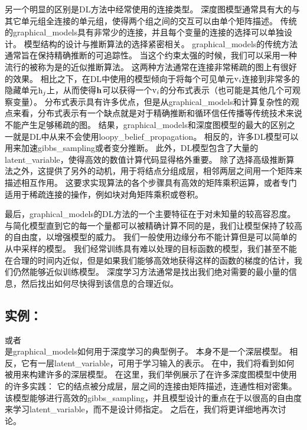 另一个明显的区别是\gls{DL}方法中经常使用的连接类型。
深度图模型通常具有大的与其它单元组全连接的单元组，使得两个组之间的交互可以由单个矩阵描述。
传统的\gls{graphical_models}具有非常少的连接，并且每个变量的连接的选择可以单独设计。
模型结构的设计与推断算法的选择紧密相关。
\gls{graphical_models}的传统方法通常旨在保持精确推断的可追踪性。
当这个约束太强的时候，我们可以采用一种流行的被称为是的近似推断算法。
这两种方法通常在连接非常稀疏的图上有很好的效果。
相比之下，在\gls{DL}中使用的模型倾向于将每个可见单元$\mathrm{v}_i$连接到非常多的隐藏单元$\mathrm{h}_j$上，从而使得$\mathbf{h}$可以获得一个$\mathrm{v}_i$的分布式表示（也可能是其他几个可观察变量）。
分布式表示具有许多优点，但是从\gls{graphical_models}和计算复杂性的观点来看，分布式表示有一个缺点就是对于精确推断和循环信任传播等传统技术来说不能产生足够稀疏的图。
结果，\gls{graphical_models}和深度图模型的最大的区别之一就是\gls{DL}中从来不会使用\gls{loopy_belief_propagation}。
相反的，许多\gls{DL}模型可以用来加速\gls{gibbs_sampling}或者变分推断。
此外，\gls{DL}模型包含了大量的\gls{latent_variable}，使得高效的数值计算代码显得格外重要。
除了选择高级推断算法之外，这提供了另外的动机，用于将结点分组成层，相邻两层之间用一个矩阵来描述相互作用。
这要求实现算法的各个步骤具有高效的矩阵乘积运算，或者专门适用于稀疏连接的操作，例如块对角矩阵乘积或卷积。



最后，\gls{graphical_models}的\gls{DL}方法的一个主要特征在于对未知量的较高容忍度。
与简化模型直到它的每一个量都可以被精确计算不同的是，我们让模型保持了较高的自由度，以增强模型的威力。
我们一般使用边缘分布不能计算但是可以简单的从中采样的模型。
我们经常训练具有难以处理的目标函数的模型，我们甚至不能在合理的时间内近似，但是如果我们能够高效地获得这样的函数的梯度的估计，我们仍然能够近似训练模型。
深度学习方法通常是找出我们绝对需要的最小量的信息，然后找出如何尽快得到该信息的合理近似。



\subsection{实例：}
\label{sec:example_the_restricted_boltzmann_machine}
\citep{Smolensky86}或者\\ 是\gls{graphical_models}如何用于深度学习的典型例子。 
本身不是一个深层模型。 
相反，它有一层\gls{latent_variable}，可用于学习输入的表示。 
在中，我们将看到如何被用来构建许多的深层模型。
在这里，我们举例展示了在许多深度图模型中使用的许多实践：
它的结点被分成层，层之间的连接由矩阵描述，连通性相对密集。
该模型能够进行高效的\gls{gibbs_sampling}，并且模型设计的重点在于以很高的自由度来学习\gls{latent_variable}，而不是设计师指定。
之后在，我们将更详细地再次讨论。

